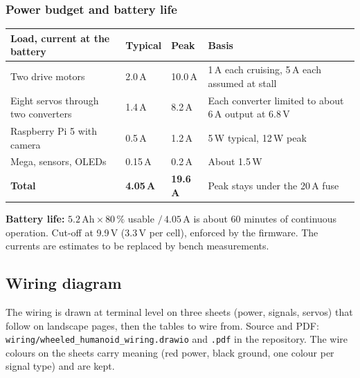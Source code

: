 \documentclass[11pt,a4paper]{article}
\newcommand{\file}[1]{{\small\nolinkurl{#1}}}
\begin{document}
\subsubsection{Power budget and battery life}
\begin{table}[H]\small
\begin{tabularx}{\linewidth}{@{}P{52mm}P{22mm}P{20mm}L@{}}
\toprule
\textbf{Load, current at the battery} & \textbf{Typical} & \textbf{Peak} & \textbf{Basis}\\
\midrule
Two drive motors & 2.0\,A & 10.0\,A & 1\,A each cruising, 5\,A each assumed at stall\\
Eight servos through two converters & 1.4\,A & 8.2\,A & Each converter limited to about 6\,A output at 6.8\,V\\
Raspberry Pi 5 with camera & 0.5\,A & 1.2\,A & 5\,W typical, 12\,W peak\\
Mega, sensors, OLEDs & 0.15\,A & 0.2\,A & About 1.5\,W\\
\midrule
\textbf{Total} & \textbf{4.05\,A} & \textbf{19.6\,A} & Peak stays under the 20\,A fuse\\
\bottomrule
\end{tabularx}
\end{table}
\textbf{Battery life:} $5.2\,\text{Ah} \times 80\,\%$ usable $/\,4.05$\,A is about 60 minutes of continuous operation. Cut-off at 9.9\,V (3.3\,V per cell), enforced by the firmware. The currents are estimates to be replaced by bench measurements.

\subsection{Wiring diagram}\label{sec:wiring}
The wiring is drawn at terminal level on three sheets (power, signals, servos) that follow on landscape pages, then the tables to wire from. Source and PDF: \file{wiring/wheeled_humanoid_wiring.drawio} and \file{.pdf} in the repository. The wire colours on the sheets carry meaning (red power, black ground, one colour per signal type) and are kept.
\end{document}
